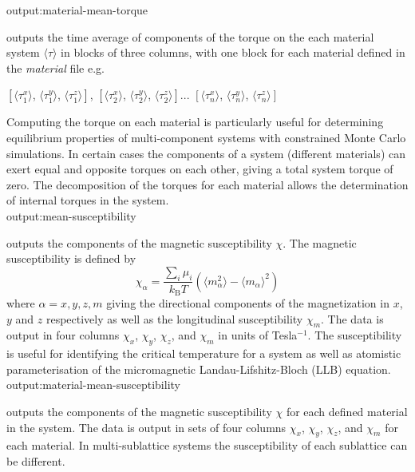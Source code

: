 
{\zicf output:material-mean-torque}
outputs the time average of components of the torque on the each material system $\langle\tau\rangle$
in blocks of three columns, with one block for each material defined in the \textit{material} file e.g.

\begin{center}
$\left[ \langle\tau_1^x \rangle \right.$, $\langle\tau_1^y \rangle$, $\left. \langle\tau_1^z \rangle \right]$,
$\left[ \langle\tau_2^x \rangle \right.$, $\langle\tau_2^y \rangle$, $\left. \langle\tau_2^z \rangle \right]$...
$\left[ \langle\tau_n^x \rangle \right.$, $\langle\tau_n^y \rangle$, $\left. \langle\tau_n^z \rangle \right]$
\end{center}

Computing the torque on each material is particularly useful for determining equilibrium
properties of multi-component systems with constrained Monte Carlo simulations. In certain
cases the components of a system (different materials) can exert equal and opposite torques
on each other, giving a total system torque of zero. The decomposition of the torques for
each material allows the determination of internal torques in the system.\\

{\zicf output:mean-susceptibility}
outputs the components of the magnetic susceptibility $\chi$. The magnetic susceptibility is defined by
\begin{equation*}
\chi_{\alpha} = \frac{\sum_i \mu_i}{k_{\mathrm{B}}T}\left(\langle m_{\alpha}^2\rangle - \langle m_{\alpha}\rangle^2 \right)
\end{equation*}
where $\alpha = x,y,z,m$ giving the directional components of the magnetization in $x$, $y$ and $z$
respectively as well as the longitudinal susceptibility $\chi_m$. The data is output in four columns
$\chi_x$, $\chi_y$, $\chi_z$, and $\chi_m$ in units of Tesla$^{-1}$. The susceptibility is useful for identifying the critical
temperature for a system as well as atomistic parameterisation of the micromagnetic
Landau-Lifshitz-Bloch (LLB) equation.\\

{\zicf output:material-mean-susceptibility} outputs
the components of the magnetic susceptibility $\chi$ for each defined material in the system. The data is output in sets of
four columns $\chi_x$, $\chi_y$, $\chi_z$, and $\chi_m$ for each material. In multi-sublattice systems the susceptibility of
each sublattice can be different.\\

